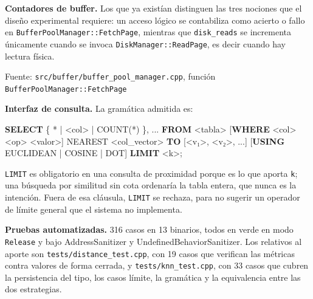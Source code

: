 \documentclass[11pt,a4paper]{article}
\newenvironment{Shaded}{}{}
\newcommand{\FunctionTok}[1]{\textcolor[rgb]{0.02,0.16,0.49}{#1}}
\newcommand{\KeywordTok}[1]{\textcolor[rgb]{0.00,0.44,0.13}{\textbf{#1}}}
\newcommand{\NormalTok}[1]{#1}
\newcommand{\OperatorTok}[1]{\textcolor[rgb]{0.40,0.40,0.40}{#1}}
\begin{document}
\textbf{Contadores de buffer.} Los que ya existían distinguen las tres
nociones que el diseño experimental requiere: un acceso lógico se
contabiliza como acierto o fallo en
\texttt{BufferPoolManager::FetchPage}, mientras que \texttt{disk\_reads}
se incrementa únicamente cuando se invoca
\texttt{DiskManager::ReadPage}, es decir cuando hay lectura física.

Fuente: \texttt{src/buffer/buffer\_pool\_manager.cpp}, función
\texttt{BufferPoolManager::FetchPage}

\textbf{Interfaz de consulta.} La gramática admitida es:

\begin{Shaded}
\begin{Highlighting}[]
\KeywordTok{SELECT}\NormalTok{ \{ }\OperatorTok{*}\NormalTok{ | }\OperatorTok{\textless{}}\NormalTok{col}\OperatorTok{\textgreater{}}\NormalTok{ | }\FunctionTok{COUNT}\NormalTok{(}\OperatorTok{*}\NormalTok{) \}, }\OperatorTok{..}\NormalTok{. }\KeywordTok{FROM} \OperatorTok{\textless{}}\NormalTok{tabla}\OperatorTok{\textgreater{}}
\NormalTok{    [}\KeywordTok{WHERE} \OperatorTok{\textless{}}\NormalTok{col}\OperatorTok{\textgreater{}} \OperatorTok{\textless{}}\NormalTok{op}\OperatorTok{\textgreater{}} \OperatorTok{\textless{}}\NormalTok{valor}\OperatorTok{\textgreater{}}\NormalTok{]}
\NormalTok{    NEAREST }\OperatorTok{\textless{}}\NormalTok{col\_vector}\OperatorTok{\textgreater{}} \KeywordTok{TO}\NormalTok{ [}\OperatorTok{\textless{}}\NormalTok{v₁}\OperatorTok{\textgreater{}}\NormalTok{, }\OperatorTok{\textless{}}\NormalTok{v₂}\OperatorTok{\textgreater{}}\NormalTok{, }\OperatorTok{..}\NormalTok{.]}
\NormalTok{    [}\KeywordTok{USING}\NormalTok{ EUCLIDEAN | COSINE | DOT]}
    \KeywordTok{LIMIT} \OperatorTok{\textless{}}\NormalTok{k}\OperatorTok{\textgreater{}}\NormalTok{;}
\end{Highlighting}
\end{Shaded}

\texttt{LIMIT} es obligatorio en una consulta de proximidad porque es lo
que aporta \texttt{k}; una búsqueda por similitud sin cota ordenaría la
tabla entera, que nunca es la intención. Fuera de esa cláusula,
\texttt{LIMIT} se rechaza, para no sugerir un operador de límite general
que el sistema no implementa.

\textbf{Pruebas automatizadas.} 316 casos en 13 binarios, todos en verde
en modo \texttt{Release} y bajo AddressSanitizer y
UndefinedBehaviorSanitizer. Los relativos al aporte son
\texttt{tests/distance\_test.cpp}, con 19 casos que verifican las
métricas contra valores de forma cerrada, y
\texttt{tests/knn\_test.cpp}, con 33 casos que cubren la persistencia
del tipo, los casos límite, la gramática y la equivalencia entre las dos
estrategias.
\end{document}

